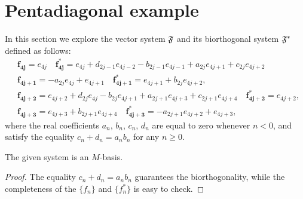 \documentclass[12pt]{amsart}
\theoremstyle{case}
\begin{document}


\section{Pentadiagonal example}
  In this section we explore the vector system $\mathfrak{F}$ and its biorthogonal system $\mathfrak{F^{*}}$ defined as follows:
  \begin{equation}
    \label{main-system}
    \begin{aligned}
      &\mathbf{f_{4j}} = e_{4j} \quad 
      \mathbf{f^*_{4j}} = e_{4j} + d_{2j - 1} e_{4j-2} - b_{2j-1} e_{4j-1} + a_{2j} e_{4j+1} + c_{2j} e_{4j+2}\\
      &\mathbf{f_{4j+1}} = -a_{2j} e_{4j} + e_{4j+1} \quad 
      \mathbf{f^*_{4j+1}} = e_{4j+1} + b_{2j} e_{4j+2},\\
      &\mathbf{f_{4j+2}} = e_{4j+2} + d_{2j} e_{4j} - b_{2j} e_{4j+1} + a_{2j+1} e_{4j+3} + c_{2j+1} e_{4j+4}\quad
      \mathbf{f^*_{4j+2}} = e_{4j+2},\\
      &\mathbf{f_{4j+3}} = e_{4j+3} + b_{2j+1} e_{4j+4}\quad
      \mathbf{f^*_{4j+3}} = -a_{2j+1} e_{4j+2} + e_{4j+3},
    \end{aligned}
  \end{equation}
    where the real coefficients $a_n$, $b_n$, $c_n$, $d_n$ are equal to zero whenever $n < 0$, and satisfy the equality
      $c_n + d_n = a_n b_n$ for any $n \geq 0$. 
  \begin{prop}
    The given system is an $M$-basis.
  \end{prop}
  \begin{proof}
    The equality $c_n + d_n = a_n b_n$ guarantees the bi\-orthogonality,
      while the completeness of the $\{f_n\}$ and $\{f_n^*\}$ is easy to check.
  \end{proof}
\end{document}
